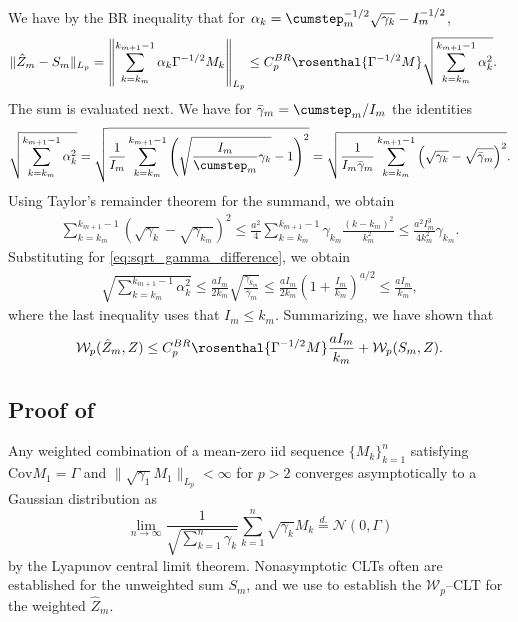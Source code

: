 \documentclass[11pt]{article}
\begin{document}
We have by the BR inequality that for $\alpha_k = \cumstep_m^{-1/2} \sqrt{\gamma_k} - I_m^{-1/2}$,
\begin{align*}
    \lVert \hat{Z}_m -  S_m\rVert_{L_p} 
    = 
    \left\lVert \sum_{k=k_m}^{k_{m+1} - 1} \alpha_k \Gamma^{-1/2} M_k  \right\rVert_{L_p}
    &\leq C^{BR}_{p} \rosenthal{\Gamma^{-1/2}M} \sqrt{\sum_{k=k_m}^{k_{m+1} - 1} \alpha_k^2} . 
\end{align*}
The sum is evaluated next. 
We have for $\bar{\gamma}_m = \cumstep_m/I_m$ the identities
\begin{equation}\label{eq:sqrt_gamma_difference}
    \sqrt{\sum_{k=k_m}^{k_{m+1} - 1} \alpha_k^2}
    = \sqrt{
    \frac{1}{I_m} \sum_{k=k_m}^{k_{m+1} - 1}\left( \sqrt{\frac{I_m}{\cumstep_m} \gamma_k} - 1 \right)^2}
  = \sqrt{\frac{1}{I_m \bar{\gamma}_m} \sum_{k=k_m}^{k_{m+1}-1} \left(\sqrt{\gamma_k} - \sqrt{\bar{\gamma}_m} \right)^2}
    .    
\end{equation}
Using Taylor's remainder theorem for the summand, we obtain
\begin{align*}
    \sum_{k=k_m}^{k_{m+1} - 1} (\sqrt{\gamma_k} - \sqrt{\gamma_{k_m}})^2
    \leq \frac{a^2}{4}\sum_{k=k_m}^{k_{m+1} - 1} \gamma_{k_m}\frac{(k - k_m)^2}{k_m^2}
    \leq \frac{a^2 I_m^3}{4 k_m^2} \gamma_{k_m} . 
\end{align*}
Substituting for \eqref{eq:sqrt_gamma_difference}, we obtain
\begin{align*}
    \sqrt{\sum_{k=k_m}^{k_{m+1} - 1} \alpha_k^2}
    \leq \frac{a I_m}{2 k_m} \sqrt{\frac{\gamma_{k_m}}{\bar{\gamma}_m}}
    \leq \frac{aI_m}{2 k_m} \left(1 + \frac{I_m}{k_m} \right)^{a/2} 
    \leq \frac{a I_m}{k_m} 
    ,
\end{align*}
where the last inequality uses that $I_m \leq k_m$. 
Summarizing, we have shown that
\begin{equation}\label{eq:weighted_clt}
    \mathcal{W}_p (\hat{Z}_m, Z) 
    \leq 
    C_{p}^{BR} \rosenthal{\Gamma^{-1/2} M} \frac{aI_m}{k_m} 
    +
    \mathcal{W}_{p} (S_m, Z) . 
\end{equation}


\subsection{Proof of }\label{app:clt_weighted}
Any weighted combination of a mean-zero iid sequence $\{M_k\}_{k=1}^n$ satisfying $\mathrm{Cov}M_1 = \Gamma$ and $\lVert \sqrt{\gamma_1} M_1 \rVert_{L_p} < \infty$ for $p > 2$ converges asymptotically to a Gaussian distribution as
\begin{equation}
    \lim_{n \to \infty} \frac{1}{\sqrt{\sum_{k=1}^n \gamma_k}} \sum_{k=1}^n \sqrt{\gamma_k} M_k \overset{d.}{=} \mathcal{N}\left(0, \Gamma \right) 
\end{equation}
by the Lyapunov central limit theorem. 
Nonasymptotic CLTs often are established for the unweighted sum $S_m$, and we use  to establish the $\mathcal{W}_p$--CLT for the weighted $\hat{Z}_m$.
\end{document}
